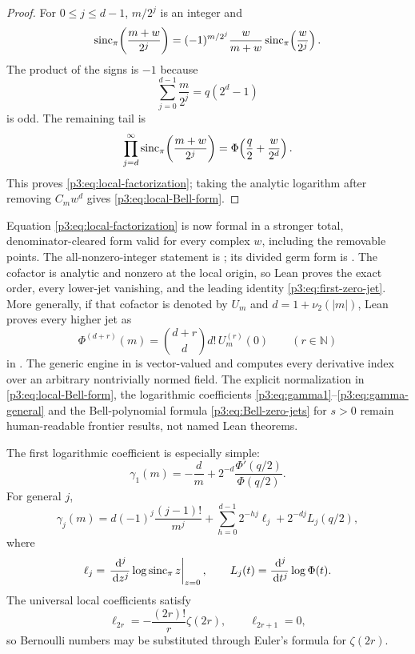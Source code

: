 \documentclass[11pt,oneside]{article}
\numberwithin{equation}{section}
\theoremstyle{definition}
\theoremstyle{remark}
\newcommand{\N}{\mathbb N}
\newcommand{\dd}{\,\mathrm d}
\begin{document}
\begin{proof}
For $0\le j\le d-1$, $m/2^j$ is an integer and
\[
 \operatorname{sinc}_{\pi}\!\left(\frac{m+w}{2^j}\right)
 =(-1)^{m/2^j}\frac{w}{m+w}
 \operatorname{sinc}_{\pi}\!\left(\frac{w}{2^j}\right).
\]
The product of the signs is $-1$ because
\[
 \sum_{j=0}^{d-1}\frac m{2^j}=q(2^d-1)
\]
is odd.  The remaining tail is
\[
 \prod_{j=d}^{\infty}\operatorname{sinc}_{\pi}\!\left(\frac{m+w}{2^j}\right)
 =\Phi\!\left(\frac q2+\frac{w}{2^d}\right).
\]
This proves \eqref{p3:eq:local-factorization}; taking the analytic logarithm after removing $C_mw^d$ gives \eqref{p3:eq:local-Bell-form}.
\end{proof}

\begin{statusbox}
Equation \eqref{p3:eq:local-factorization} is now formal in a stronger total,
denominator-cleared form valid for every complex \(w\), including the
removable points.  The all-nonzero-integer statement is
; its divided
germ form is
.
The cofactor is analytic and nonzero at the local origin, so Lean proves the exact order, every
lower-jet vanishing, and the leading identity
\eqref{p3:eq:first-zero-jet}.  More generally, if that cofactor is denoted by
\(U_m\) and \(d=1+\nu_2(|m|)\), Lean proves every higher jet as
\[
 \Phi^{(d+r)}(m)=\binom{d+r}{d}d!\,U_m^{(r)}(0)
 \qquad(r\in\N)
\]
in .
The generic engine in  is vector-valued and computes
every derivative index over an arbitrary nontrivially normed field.  The
explicit normalization in \eqref{p3:eq:local-Bell-form}, the logarithmic coefficients
\eqref{p3:eq:gamma1}--\eqref{p3:eq:gamma-general} and the Bell-polynomial formula
\eqref{p3:eq:Bell-zero-jets} for \(s>0\) remain human-readable frontier
results, not named Lean theorems.
\end{statusbox}

The first logarithmic coefficient is especially simple:
\begin{equation}
 \gamma_1(m)=-\frac d m
 +2^{-d}\frac{\Phi'(q/2)}{\Phi(q/2)}.
 \label{p3:eq:gamma1}
\end{equation}
For general $j$,
\begin{equation}
 \gamma_j(m)
 =d(-1)^j\frac{(j-1)!}{m^j}
 +\sum_{h=0}^{d-1}2^{-hj}\ell_j
 +2^{-dj}L_j(q/2),
 \label{p3:eq:gamma-general}
\end{equation}
where
\[
 \ell_j=\left.\frac{\dd^j}{\dd z^j}\log\sincpi z\right|_{z=0},
 \qquad
 L_j(t)=\frac{\dd^j}{\dd t^j}\log\Phi(t).
\]
The universal local coefficients satisfy
\begin{equation}
 \ell_{2r}=-\frac{(2r)!}{r}\zeta(2r),
 \qquad \ell_{2r+1}=0,
 \label{p3:eq:sinc-log-jet}
\end{equation}
so Bernoulli numbers may be substituted through Euler's formula for $\zeta(2r)$.
\end{document}
